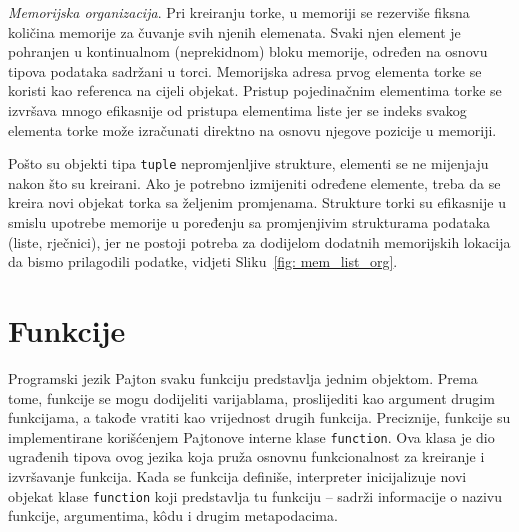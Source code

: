 \textit{Memorijska organizacija}.  Pri kreiranju torke, u memoriji se rezerviše fiksna količina memorije za čuvanje svih njenih elemenata. Svaki njen element je pohranjen u kontinualnom  (neprekidnom) bloku memorije,  određen na osnovu tipova podataka sadržani u torci.  Memorijska adresa prvog elementa torke se koristi kao referenca na cijeli objekat. %
Pristup pojedina\-čnim eleme\-ntima torke se izvršava mnogo efikasnije od pristupa elementima liste jer se indeks svakog elementa torke može  izračunati direktno na osnovu njegove pozicije u memoriji. 

Pošto su objekti tipa \texttt{tuple} nepromjenljive strukture, elementi se ne mijenjaju  nakon što su kreirani. Ako je  potrebno izmijeniti određene elemente, treba da se kreira novi objekat torka sa željenim promjenama. Strukture torki su  efikasnije u smislu upotrebe memorije u poređenju sa promjenjivim strukturama podataka (liste, rječnici), jer ne postoji potreba za dodijelom dodatnih memorijskih lokacija da bismo prilagodili podatke, vidjeti Sliku~\ref{fig: mem_list_org}.
 

\section{Funkcije}

Programski jezik Pajton svaku funkciju predstavlja jednim objektom. Prema tome, funkcije se mogu dodijeliti varijablama, proslijediti kao argument  drugim funkcijama, a takođe vratiti kao vrijednost    drugih funkcija.  Preciznije, funkcije su implementirane korišćenjem Pajtonove interne klase  \texttt{function}. Ova klasa je dio ugrađenih tipova ovog jezika koja pruža osnovnu funkciona\-lnost za kreiranje i izvršavanje funkcija. Kada se funkcija definiše, interpreter inicijalizu\-je novi objekat klase \texttt{function} koji predstavlja tu funkciju -- sadrži informacije o nazivu funkcije, argumentima, k\^odu i drugim metapo\-dacima.

